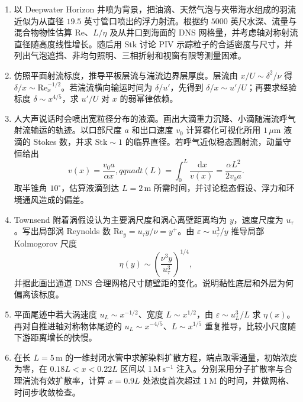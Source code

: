 \documentclass[12pt,a4paper,openany,fontset=none]{ctexbook}
\newcommand{\Rey}{\mathrm{Re}}
\newcommand{\dd}{\,\mathrm d}
\begin{document}
\begin{enumerate}[label=\arabic*.,start=1]
 \item 以 Deepwater Horizon 井喷为背景，把油滴、天然气泡与夹带海水组成的羽流近似为从直径 $19.5$ 英寸管口喷出的浮力射流。根据约 $5000$ 英尺水深、流量与混合物物性估算 $\Rey$、$L/\eta$ 及从井口到海面的 DNS 网格量，并考虑轴对称射流直径随高度线性增长。随后用 $\mathrm{Stk}$ 讨论 PIV 示踪粒子的合适密度与尺寸，并列出气泡遮挡、非均匀照明、三相折射和视窗有限等测量困难。

 \item 仿照平面射流标度，推导平板层流与湍流边界层厚度。层流由 $x/U\sim\delta^2/\nu$ 得 $\delta/x\sim\Rey_x^{-1/2}$。若湍流横向输运时间为 $\delta/u'$，先得到 $\delta/x\sim u'/U$；再要求经验标度 $\delta\sim x^{4/5}$，求 $u'/U$ 对 $x$ 的弱幂律依赖。

 \item 人大声说话时会喷出宽粒径分布的液滴。画出大滴重力沉降、小滴随湍流呼气射流输运的轨迹。以口部尺度 $a$ 和出口速度 $v_0$ 计算雾化可视化所用 $1\,\mu\mathrm m$ 液滴的 Stokes 数，并求 $\mathrm{Stk}\sim1$ 的临界直径。若呼气近似稳态圆射流，动量守恒给出
 \begin{equation}
  v(x)=\frac{v_0a}{\alpha x},qquad
  t(L)=\int_0^L\frac{\dd x}{v(x)}=\frac{\alpha L^2}{2v_0a}.
 \end{equation}
 取半锥角 $10^\circ$，估算液滴到达 $L=2\,\mathrm m$ 所需时间，并讨论稳态假设、浮力和环境通风造成的偏差。

 \item Townsend 附着涡假设认为主要涡尺度和涡心离壁距离均为 $y$，速度尺度为 $u_\tau$。写出局部涡 Reynolds 数 $\Rey_y=u_\tau y/\nu=y^+$。由 $\varepsilon\sim u_\tau^3/y$ 推导局部 Kolmogorov 尺度
 \begin{equation}
  \eta(y)\sim\left(\frac{\nu^3y}{u_\tau^3}\right)^{1/4},
 \end{equation}
 并据此画出通道 DNS 合理网格尺寸随壁距的变化。说明黏性底层和外层为何偏离该标度。

 \item 平面尾迹中若大涡速度 $u_L\sim x^{-1/2}$、宽度 $L\sim x^{1/2}$，由 $\varepsilon\sim u_L^3/L$ 求 $\eta(x)$。再对自推进轴对称物体尾迹的 $u_L\sim x^{-4/5}$、$L\sim x^{1/5}$ 重复推导，比较小尺度随下游距离增长的快慢。

 \item 在长 $L=5\,\mathrm m$ 的一维封闭水管中求解染料扩散方程，端点取零通量，初始浓度为零，在 $0.18L<x<0.22L$ 区间以 $1\,\mathrm{M\,s^{-1}}$ 注入。分别采用分子扩散率与合理湍流有效扩散率，计算 $x=0.9L$ 处浓度首次超过 $1\,\mathrm M$ 的时间，并做网格、时间步收敛检查。
\end{enumerate}
\end{document}
